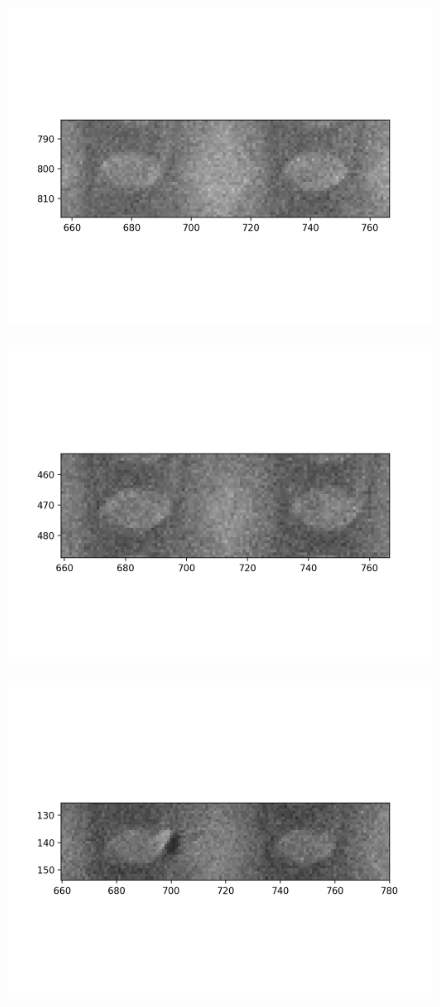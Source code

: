 \documentclass[10pt,a4paper]{article}
\begin{document}
\begin{figure}
	\includegraphics{data/image_stamps/c10}
\end{figure}
\begin{figure}
	\includegraphics{data/image_stamps/c11}
\end{figure}
\begin{figure}
	\includegraphics{data/image_stamps/c12}
\end{figure}
\end{document}
